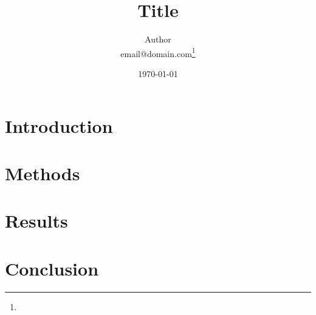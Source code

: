 \documentclass[a4paper,british]{scrartcl}
\begin{document}
\ifpdf
\else
\fi

\title{Title}
\author{Author \\
{email@domain.com}\thanks{}}	%
\date{\today}
\maketitle

\begin{abstract}

\end{abstract}

\section{Introduction}\label{sec:intro}

\section{Methods}\label{sec:methods}

\section{Results}\label{sec:results}

\section{Conclusion}\label{sec:conclusion}

\end{document}
